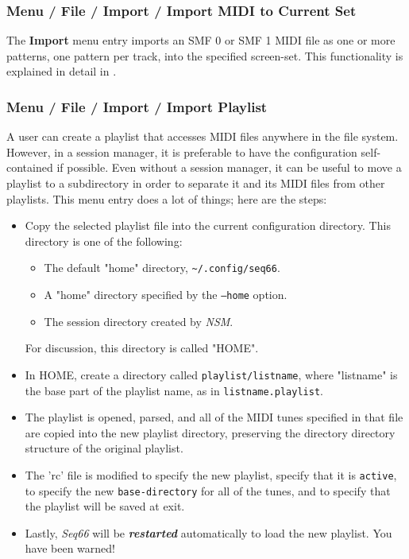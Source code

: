 \subsubsection{Menu / File / Import / Import MIDI to Current Set}
\label{subsubsec:menu_file_import}

   The \textbf{Import} menu entry imports an SMF 0
   or SMF 1 MIDI file as one or more patterns, one pattern per track,
   into the specified screen-set.
   This functionality is explained in detail in
   .

\subsubsection{Menu / File / Import / Import Playlist}
\label{subsubsec:menu_file_import_playlisMIDI to Current Sett}

   A user can create a playlist that accesses MIDI files anywhere in the file
   system.
   However, in a session manager, it is preferable to have the configuration
   self-contained if possible.
   Even without a session manager, it can be useful to move a playlist to a
   subdirectory in order to separate it and its MIDI files from other
   playlists.
   This menu entry does a lot of things; here are the steps:

   \begin{itemize}
      \item Copy the selected playlist file into the current configuration
         directory.  This directory is one of the following:
         \begin{itemize}
            \item The default "home" directory,
               \texttt{\textasciitilde/.config/seq66}.
            \item A "home" directory specified by the \texttt{--home} option.
            \item The session directory created by \textsl{NSM}.
         \end{itemize}
         For discussion, this directory is called "HOME".
      \item In HOME, create a directory called \texttt{playlist/listname}, where
         "listname" is the base part of the playlist name, as in
         \texttt{listname.playlist}.
      \item The playlist is opened, parsed, and all of the MIDI tunes specified
         in that file are copied into the new playlist directory, preserving
         the directory directory structure of the original playlist.
      \item The 'rc' file is modified to specify the new playlist,
         specify that it is \texttt{active},
         to specify the new \texttt{base-directory} for all of the tunes,
         and to specify that the playlist will be saved at exit.
      \item Lastly, \textsl{Seq66} will be
         \textsl{\textbf{restarted}} automatically to load the new playlist.
         You have been warned!
   \end{itemize}

